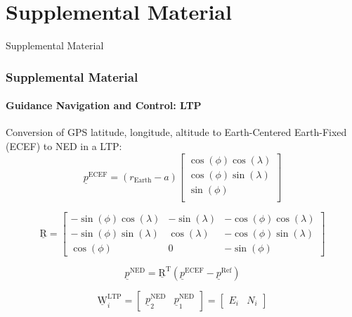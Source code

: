 \documentclass[professionalfont,10pt]{beamer}
\begin{document}
	
	\section{Supplemental Material}
	\begin{frame}[t]{Supplemental Material}
		\frametitle{Supplemental Material}
		\framesubtitle{Guidance Navigation and Control: LTP}
		
		\hskip-0.75cm
		\begin{minipage}[t]{0.2\linewidth}\vspace{-0.5cm}
			\tiny\tableofcontents[currentsection,currentsubsection,hideothersubsections,subsectionstyle=show/shaded]
			\vfill%
		\end{minipage}
		\hfill%
		\begin{minipage}[t]{0.86\linewidth}\vspace{-0.5cm}
			Conversion of GPS latitude, longitude, altitude to Earth-Centered Earth-Fixed (ECEF) to NED in a LTP:
			\begin{equation}
			\underline{p}^\text{ECEF} =
			(r_\text{Earth} - a) 
			\begin{bmatrix}
			\cos(\phi) \cos(\lambda)\\
			\cos(\phi) \sin(\lambda)\\
			\sin(\phi)\\
			\end{bmatrix}
			\end{equation}
			
			\begin{equation} 
			\underline{\text{R}} = 
			\begin{bmatrix}
			-\sin(\phi)\cos(\lambda) & -\sin(\lambda) & -\cos(\phi)\cos(\lambda) \\
			-\sin(\phi)\sin(\lambda) & \cos(\lambda) & -\cos(\phi)\sin(\lambda) \\
			\cos(\phi) & 0 & -\sin(\phi)
			\end{bmatrix}
			\end{equation}
			
			\begin{equation}
			\underline{p}^\text{NED} = \underline{\text{R}}^\text{T}(\underline{p}^\text{ECEF} - \underline{p}^\text{Ref})
			\end{equation}
			
			\begin{equation}
			\underline{\text{W}}_i^\text{LTP} = 
			\begin{bmatrix}
			\underline{p}_2^\text{NED} & 
			\underline{p}_1^\text{NED}
			\end{bmatrix}
			=
			\begin{bmatrix}
			E_i & N_i 
			\end{bmatrix}
			\end{equation}
			\vfill%
		\end{minipage}
		
	\end{frame}
\end{document}
